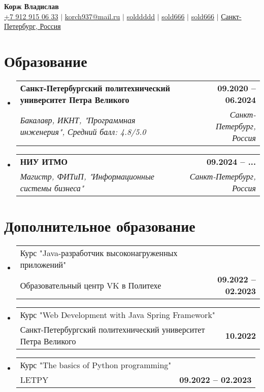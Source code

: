 \documentclass[a4paper,9pt]{report}
\makeatletter
\newcommand{\resumeSubheading}[4]{
    \vspace{-2pt}\item
    \begin{tabular*}{1.0\textwidth}[t]{l@{\extracolsep{\fill}}r}
        \textbf{\normalsize#1} & \textbf{\small #2} \\
        \textit{\normalsize#3} & \textit{\small #4} \\

    \end{tabular*}\vspace{-7pt}
}
\newcommand{\resumeSubheadingAdditional}[2]{
    \vspace{-2pt}\item
    \begin{tabular*}{1.0\textwidth}[t]{l@{\extracolsep{\fill}}r}
        \normalsize#1 & \textbf{\small #2} \\

    \end{tabular*}\vspace{-7pt}
}
\newcommand{\resumeSubHeadingListStart}{\begin{itemize}[leftmargin=0.0in, label={}]}
\newcommand{\resumeSubHeadingListEnd}{\end{itemize}}
\makeatother
\begin{document}
\begin{center}
\textbf{\huge Корж Владислав} \\ \vspace{5pt}
\small
\textcolor{YellowGreen}{\faMobile} \hspace{.5pt} \href{tel:+79129150633}{+7 912 915 06 33}
$|$
\textcolor{YellowGreen}{\faAt} \hspace{.5pt} \href{mailto:korch937@mail.ru}{korch937@mail.ru}
$|$
\textcolor{YellowGreen}{\faTelegram} \hspace{.5pt} \href{https://t.me/solddddd}{solddddd}
$|$
\textcolor{YellowGreen}{\faLinkedin} \hspace{.5pt} \href{https://www.linkedin.com/in/sold666/}{sold666}
$|$
\textcolor{YellowGreen}{\faGithub} \hspace{.5pt} \href{https://github.com/sold666}{sold666}
$|$
\textcolor{YellowGreen}{\faMapMarker} \hspace{.5pt} \href{https://maps.app.goo.gl/VvvW63dZxLZH6iVR6}{Санкт-Петербург, Россия}
\end{center}

\section{Образование}
\resumeSubHeadingListStart
\resumeSubheading
{Санкт-Петербургский политехнический университет Петра Великого}{09.2020 -- 06.2024}
{Бакалавр, ИКНТ, "Программная инженерия", Средний балл: 4.8/5.0}{Санкт-Петербург, Россия}

\resumeSubheading
{НИУ ИТМО}{09.2024 -- ...}
{Магистр, ФИТиП, "Информационные системы бизнеса"}{Санкт-Петербург, Россия}
\resumeSubHeadingListEnd

\section{Дополнительное образование}
\resumeSubHeadingListStart
\resumeSubheadingAdditional
{Курс "Java-разработчик высоконагруженных приложений" \\ Образовательный центр VK в Политехе}{09.2022 -- 02.2023}
\resumeSubHeadingListEnd

\resumeSubHeadingListStart
\resumeSubheadingAdditional
{Курс "Web Development with Java Spring Framework" \\ Санкт-Петербургский политехнический университет Петра Великого}{10.2022}
\resumeSubHeadingListEnd

\resumeSubHeadingListStart
\resumeSubheadingAdditional
{Курс "The basics of Python programming" \\ LETPY}{09.2022 -- 02.2023}
\resumeSubHeadingListEnd
\end{document}
